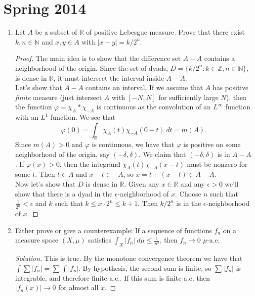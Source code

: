 \documentclass[11pt,letterpaper]{report}
\newcommand{\naturals}{\mathbb{N}}
\newcommand{\integers}{\mathbb{Z}}
\newcommand{\reals}{\mathbb{R}}
\newenvironment{solution}
{\begin{proof}[Solution]}
{\end{proof}}
\begin{document}
\section{Spring 2014}
\begin{enumerate}
	\item Let $A$ be a subset of $\reals$ of positive Lebesgue measure. Prove that there exist $k,n\in\naturals$ and $x,y\in A$ with $|x-y| = k/2^n$.
	\begin{proof}
		The main idea is to show that the difference set $A-A$ contains a neighborhood of the origin. Since the set of dyads, $D = \{k/2^n: k\in \integers, n\in \naturals\}$, is dense in $\reals$, it must intersect the interval inside $A-A$.\\

		Let's show that $A-A$ contains an interval. If we assume that $A$ has positive \textit{finite} measure (just intersect $A$ with $[-N, N]$ for sufficiently large $N$), then the function $\varphi = \chi_A *\chi_{-A}$ is continuous as the convolution of an $L^\infty$ function with an $L^1$ function. We see that
		\[
		\varphi(0) = \int_\reals \chi_A(t)\chi_{-A}(0-t)\ dt = m(A).
		\]
		Since $m(A)>0$ and $\varphi$ is continuous, we have that $\varphi$ is positive on some neighborhood of the origin, say $(-\delta, \delta)$. We claim that $(-\delta, \delta)$ is in $A-A$. If $\varphi(x)>0$, then the integrand $\chi_A(t)\chi_{-A}(x-t)$ must be nonzero for some $t$. Then $t\in A$ and $x-t\in -A$, so $x=t +(x-t)\in A-A$.\\

		Now let's show that $D$ is dense in $\reals$. Given any $x\in \reals$ and any $\epsilon>0$ we'll show that there is a dyad in the $\epsilon$-neighborhood of $x$. Choose $n$ such that $\frac{1}{2^n}<\epsilon$ and $k$ such that $k \leq x\cdot 2^{n}\leq k+1$. Then $k/2^n$ is in the $\epsilon$-neighborhood of $x$.
	\end{proof}

	\item Either prove or give a counterexample: If a sequence of functions $f_n$ on a measure space $(X, \mu)$ satisfies $\int_X|f_n|\ d\mu \leq \frac{1}{n^2}$, then $f_n\to 0$ $\mu$-a.e.
	\begin{solution}
		This is true. By the monotone convergence theorem we have that $\int \sum |f_n| = \sum \int |f_n|$. By hypothesis, the second sum is finite, so $\sum |f_n|$ is integrable, and therefore finite a.e.. If this sum is finite a.e. then $|f_n(x)| \to 0$ for almost all $x$.
	\end{solution}


\end{enumerate}
\end{document}
